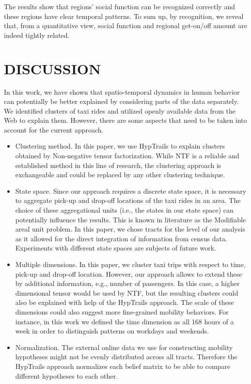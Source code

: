 \documentclass[a4paper, 10pt, conference]{ieeeconf}      %
\begin{document}
The results show that regions’ social function can be recognized correctly and these regions have clear temporal patterns. To sum up, by recognition, we reveal that, from a quantitative view, social function and regional get-on/off amount are indeed tightly related.

\section{DISCUSSION}
In this work, we have shown that spatio-temporal dynamics in human behavior can potentially be better explained by considering parts of the data separately. We identified clusters of taxi rides and utilized openly available data from the Web to explain them. However, there are some aspects that need to be taken into account for the current approach.

\begin{itemize}

\item Clustering method. In this paper, we use HypTrails to explain clusters obtained by Non-negative tensor factorization. While NTF is a reliable and established method in this line of research, the clustering approach is exchangeable and could be replaced by any other clustering technique.
\item State space. Since our approach requires a discrete state space, it is necessary to aggregate pick-up and drop-off locations of the taxi rides in an area. The choice of these aggregational units (i.e., the states in our state space) can potentially influence the results. This is known in literature as the Modifiable areal unit problem. In this paper, we chose tracts for the level of our analysis as it allowed for the direct integration of information from census data. Experiments with different state spaces are subjects of future work.
\item Multiple dimensions. In this paper, we cluster taxi trips with respect to time, pick-up and drop-off location. However, our approach allows to extend these by additional information, e.g., number of passengers. In this case, a higher dimensional tensor would be used by NTF, but the resulting clusters could also be explained with help of the HypTrails approach. The scale of these dimensions could also suggest more fine-grained mobility behaviors. For instance, in this work we defined the time dimension as all 168 hours of a week in order to distinguish patterns on workdays and weekends.
\item Normalization. The external online data we use for constructing mobility hypotheses might not be evenly distributed across all tracts. Therefore the HypTrails approach normalizes each belief matrix to be able to compare different hypotheses to each other.
\end{itemize}
\end{document}
